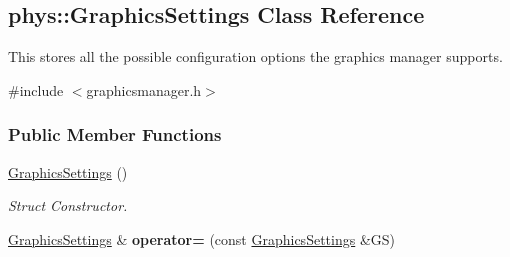 \hypertarget{structphys_1_1GraphicsSettings}{
\subsection{phys::GraphicsSettings Class Reference}
\label{d0/dd0/structphys_1_1GraphicsSettings}
}


This stores all the possible configuration options the graphics manager supports.  




{\ttfamily \#include $<$graphicsmanager.h$>$}

\subsubsection*{Public Member Functions}
\begin{DoxyCompactItemize}
\item 
\hypertarget{structphys_1_1GraphicsSettings_aceaaf53585413067adbf271e2c1e48fa}{
\hyperlink{structphys_1_1GraphicsSettings_aceaaf53585413067adbf271e2c1e48fa}{GraphicsSettings} ()}
\label{d0/dd0/structphys_1_1GraphicsSettings_aceaaf53585413067adbf271e2c1e48fa}

\begin{DoxyCompactList}\small\item\em Struct Constructor. \item\end{DoxyCompactList}\item 
\hypertarget{structphys_1_1GraphicsSettings_a9f9ae60c530d078307cf3ee9f39821fe}{
\hyperlink{structphys_1_1GraphicsSettings}{GraphicsSettings} \& {\bfseries operator=} (const \hyperlink{structphys_1_1GraphicsSettings}{GraphicsSettings} \&GS)}
\label{d0/dd0/structphys_1_1GraphicsSettings_a9f9ae60c530d078307cf3ee9f39821fe}

\end{DoxyCompactItemize}
